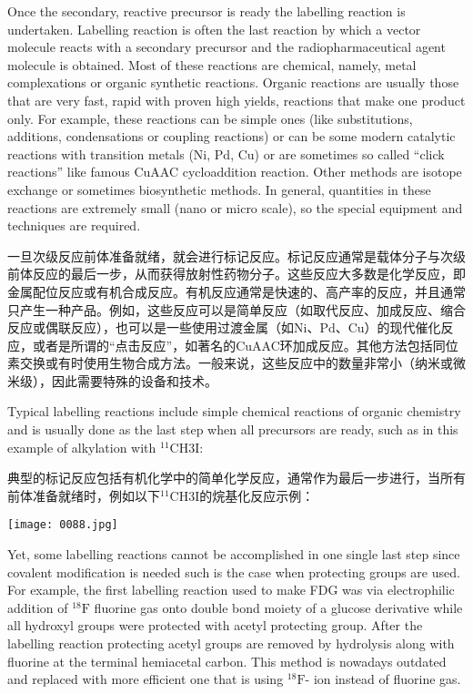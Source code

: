 \documentclass[dvipsnames, svgnames,a4paper,11pt]{article}
\begin{document}
Once the secondary, reactive precursor is ready the labelling reaction is undertaken.
Labelling reaction is often the last reaction by which a vector molecule reacts with a
secondary precursor and the radiopharmaceutical agent molecule is obtained. Most
of these reactions are chemical, namely, metal complexations or organic synthetic
reactions. Organic reactions are usually those that are very fast, rapid with proven
high yields, reactions that make one product only. For example, these reactions can
be simple ones (like substitutions, additions, condensations or coupling reactions) or
can be some modern catalytic reactions with transition metals (Ni, Pd, Cu) or are
sometimes so called “click reactions” like famous CuAAC cycloaddition reaction.
Other methods are isotope exchange or sometimes biosynthetic methods. In general,
quantities in these reactions are extremely small (nano or micro scale), so the
special equipment and techniques are required.

一旦次级反应前体准备就绪，就会进行标记反应。标记反应通常是载体分子与次级前体反应的最后一步，从而获得放射性药物分子。这些反应大多数是化学反应，即金属配位反应或有机合成反应。有机反应通常是快速的、高产率的反应，并且通常只产生一种产品。例如，这些反应可以是简单反应（如取代反应、加成反应、缩合反应或偶联反应），也可以是一些使用过渡金属（如Ni、Pd、Cu）的现代催化反应，或者是所谓的“点击反应”，如著名的CuAAC环加成反应。其他方法包括同位素交换或有时使用生物合成方法。一般来说，这些反应中的数量非常小（纳米或微米级），因此需要特殊的设备和技术。

Typical labelling reactions include simple chemical reactions of organic chemistry
and is usually done as the last step when all precursors are ready, such as in this
example of alkylation with ${}^{11}\mathrm{C}$H3I:

典型的标记反应包括有机化学中的简单化学反应，通常作为最后一步进行，当所有前体准备就绪时，例如以下${}^{11}\mathrm{C}$H3I的烷基化反应示例：

\begin{figure*}[h]
    \centering
    \texttt{[image: 0088.jpg]}
\end{figure*}

Yet, some labelling reactions cannot be accomplished in one single last step since
covalent modification is needed such is the case when protecting groups are used.
For example, the first labelling reaction used to make FDG was via electrophilic
addition of ${}^{18}\mathrm{F}$ fluorine gas onto double bond moiety of a glucose derivative while all
hydroxyl groups were protected with acetyl protecting group. After the labelling
reaction protecting acetyl groups are removed by hydrolysis along with fluorine at the
terminal hemiacetal carbon. This method is nowadays outdated and replaced with
more efficient one that is using ${}^{18}\mathrm{F}$- ion instead of fluorine gas.
\end{document}
